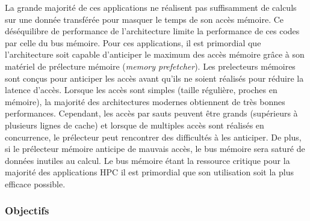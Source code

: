     
        La grande majorité de ces applications ne réalisent pas suffisamment de calculs sur une donnée transférée pour masquer le temps de son accès mémoire. Ce déséquilibre de performance de l'architecture limite la performance de ces codes par celle du bus mémoire. 
        Pour ces applications, il est primordial que l'architecture soit capable d'anticiper le maximum des accès mémoire grâce à son matériel de prélecture mémoire (\textit{memory prefetcher}). Les \glspl{prelecteur} mémoires sont conçus pour anticiper les accès avant qu'ils ne soient réalisés pour réduire la latence d'accès. Lorsque les accès sont simples (taille régulière, proches en mémoire), la majorité des architectures modernes obtiennent de très bonnes performances. Cependant, les accès par sauts peuvent être grands (supérieurs à plusieurs lignes de cache) et lorsque de multiples accès sont réalisés en concurrence, le prélecteur peut rencontrer des difficultés à les anticiper. De plus, si le prélecteur mémoire anticipe de mauvais accès, le bus mémoire sera saturé de données inutiles au calcul. Le bus mémoire étant la ressource critique pour la majorité des applications HPC il est primordial que son utilisation soit la plus efficace possible.  
    
        

    \subsubsection{Objectifs}
        
